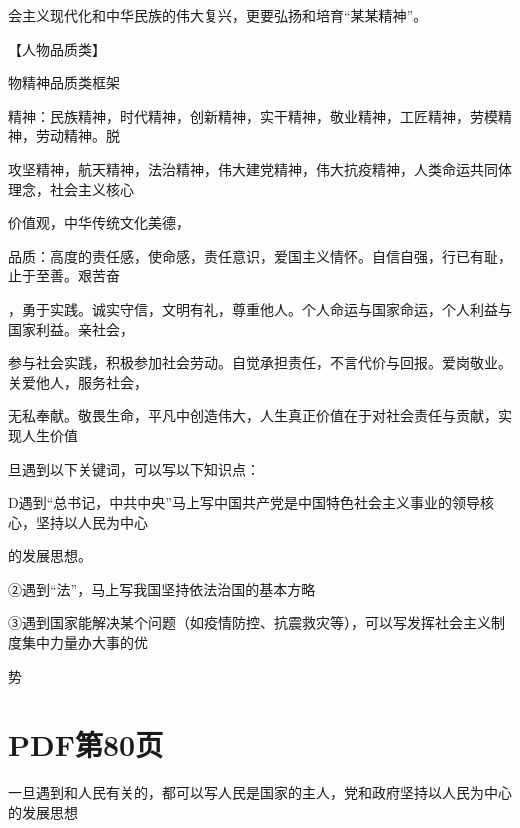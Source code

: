 \documentclass[lang=cn,11pt]{elegantbook}
\newcommand{\daofasym}[1]{{\daofasymbolfont #1}}
\newcommand{\daofasym}[1]{#1}
\begin{document}
会主义现代化和中华民族的伟大复兴，更要弘扬和培育“某某精神”。\par

【人物品质类】\par

物精神品质类框架\par

精神：民族精神，时代精神，创新精神，实干精神，敬业精神，工匠精神，劳模精神，劳动精神。脱\par

攻坚精神，航天精神，法治精神，伟大建党精神，伟大抗疫精神，人类命运共同体理念，社会主义核心\par

价值观，中华传统文化美德，\par

品质：高度的责任感，使命感，责任意识，爱国主义情怀。自信自强，行已有耻，止于至善。艰苦奋\par

，勇于实践。诚实守信，文明有礼，尊重他人。个人命运与国家命运，个人利益与国家利益。亲社会，\par

参与社会实践，积极参加社会劳动。自觉承担责任，不言代价与回报。爱岗敬业。关爱他人，服务社会，\par

无私奉献。敬畏生命，平凡中创造伟大，人生真正价值在于对社会责任与贡献，实现人生价值\par

旦遇到以下关键词，可以写以下知识点：\par

D遇到“总书记，中共中央”马上写中国共产党是中国特色社会主义事业的领导核心，坚持以人民为中心\par

的发展思想。\par

\daofasym{②}遇到“法”，马上写我国坚持依法治国的基本方略\par

\daofasym{③}遇到国家能解决某个问题（如疫情防控、抗震救灾等），可以写发挥社会主义制度集中力量办大事的优\par

势\par


\section*{PDF第80页}

一旦遇到和人民有关的，都可以写人民是国家的主人，党和政府坚持以人民为中心的发展思想\par
\end{document}
